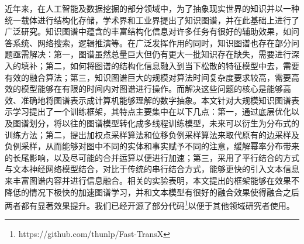 \begin{cabstract}

  近年来，在人工智能及数据挖掘的部分领域中，为了抽象现实世界的知识并以一种统一载体进行结构化存储，学术界和工业界提出了知识图谱，并在此基础上进行了广泛研究。知识图谱中蕴含的丰富结构化信息对许多任务有很好的辅助效果，如问答系统、网络搜索，逻辑推演等。在广泛发挥作用的同时，知识图谱也存在部分问题亟需解决：第一，图谱虽然总量巨大但仍有更大一批知识存在缺失，需要进行深入的填补；第二，如何将图谱的结构化信息融入到当下松散的特征模型中去，需要有效的融合算法；第三，知识图谱巨大的规模对算法时间复杂度要求较高，需要高效的模型能够在有限的时间内对图谱进行操作。而解决这些问题的核心是能够高效、准确地将图谱表示成计算机能够理解的数字抽象。本文针对大规模知识图谱表示学习提出了一个训练框架，其特点主要集中在以下几点：第一，通过底层优化以及图谱划分，将以往的图谱模型转化成多线程训练模型，未来可以衍生为分布式的训练方法；第二，提出加权点采样算法和位移负例采样算法来取代原有的边采样及负例采样，从而能够对图中不同的实体和事实赋予不同的注意，缓解幂率分布带来的长尾影响，以及尽可能的合并运算以便进行加速；第三，采用了平行结合的方式与文本神经网络模型结合，对比于传统的串行结合方式，能够更快的引入文本信息来丰富图谱内容并进行信息融合。相关的实验表明，本文提出的框架能够在效果不降低的情况下极快的加速图谱学习，并和文本模型有很好的融合效果使得融合之后两者都有显著效果提升。我们已经开源了部分代码\footnote{https://github.com/thunlp/Fast-TransX}以便于其他领域研究者使用。

\end{cabstract}


